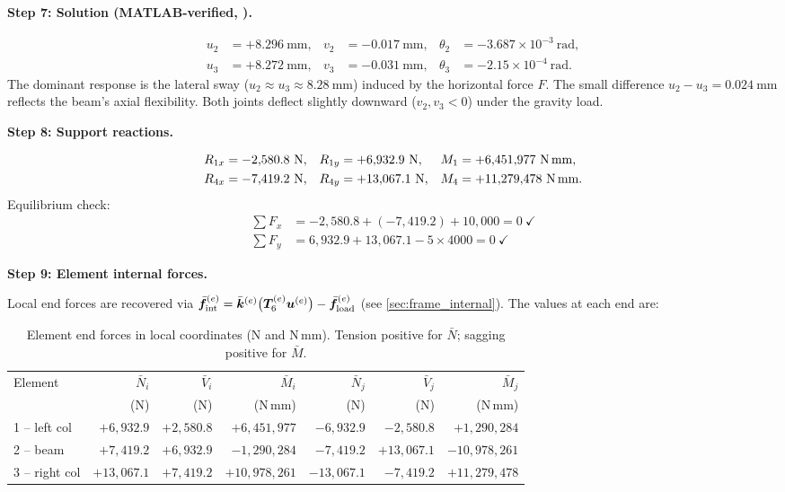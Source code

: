 \begin{example}
\medskip
\noindent\textbf{Step 7: Solution (MATLAB-verified, ).}

\begin{align*}
    u_2 &= +8.296\ \text{mm}, &
    v_2 &= -0.017\ \text{mm}, &
    \theta_2 &= -3.687\times10^{-3}\ \text{rad}, \\
    u_3 &= +8.272\ \text{mm}, &
    v_3 &= -0.031\ \text{mm}, &
    \theta_3 &= -2.15\times10^{-4}\ \text{rad}.
\end{align*}
The dominant response is the lateral sway ($u_2 \approx u_3 \approx 8.28\ \text{mm}$)
induced by the horizontal force $F$. The small difference $u_2 - u_3 =
0.024\ \text{mm}$ reflects the beam's axial flexibility. Both joints deflect
slightly downward ($v_2, v_3 < 0$) under the gravity load.

\medskip
\noindent\textbf{Step 8: Support reactions.}

\begin{align*}
    R_{1x} &= -2{,}580.8\ \text{N}, &
    R_{1y} &= +6{,}932.9\ \text{N}, &
    M_1    &= +6{,}451{,}977\ \text{N\,mm}, \\
    R_{4x} &= -7{,}419.2\ \text{N}, &
    R_{4y} &= +13{,}067.1\ \text{N}, &
    M_4    &= +11{,}279{,}478\ \text{N\,mm}.
\end{align*}
\noindent Equilibrium check:
\begin{align*}
    \textstyle\sum F_x &= -2{,}580.8 + (-7{,}419.2) + 10{,}000 = 0\ \checkmark\\
    \textstyle\sum F_y &= 6{,}932.9 + 13{,}067.1 - 5\times4000 = 0\ \checkmark
\end{align*}

\medskip
\noindent\textbf{Step 9: Element internal forces.}

Local end forces are recovered via
$\bar{\bm{f}}^{(e)}_{\text{int}} =
\bar{\bm{k}}^{(e)}\bigl(\bm{T}_6^{(e)}\bm{u}^{(e)}\bigr)
- \bar{\bm{f}}^{(e)}_{\text{load}}$
(see \cref{sec:frame_internal}). The values at each end are:

\begin{table}[htbp]
\centering
\small
\caption{Element end forces in local coordinates (N and N\,mm).
Tension positive for $\bar{N}$; sagging positive for $\bar{M}$.}
\label{tab:frame_internal}
\begin{tabular}{@{}lrrrrrr@{}}
\toprule
Element & $\bar{N}_i$ & $\bar{V}_i$ & $\bar{M}_i$
        & $\bar{N}_j$ & $\bar{V}_j$ & $\bar{M}_j$ \\
        & (N) & (N) & (N\,mm) & (N) & (N) & (N\,mm)\\
\midrule
1 -- left col  & $+6{,}932.9$ & $+2{,}580.8$ & $+6{,}451{,}977$ & $-6{,}932.9$ & $-2{,}580.8$ & $+1{,}290{,}284$ \\
2 -- beam      & $+7{,}419.2$ & $+6{,}932.9$ & $-1{,}290{,}284$ & $-7{,}419.2$ & $+13{,}067.1$ & $-10{,}978{,}261$ \\
3 -- right col & $+13{,}067.1$ & $+7{,}419.2$ & $+10{,}978{,}261$ & $-13{,}067.1$ & $-7{,}419.2$ & $+11{,}279{,}478$ \\
\bottomrule
\end{tabular}
\end{table}


\end{example}
